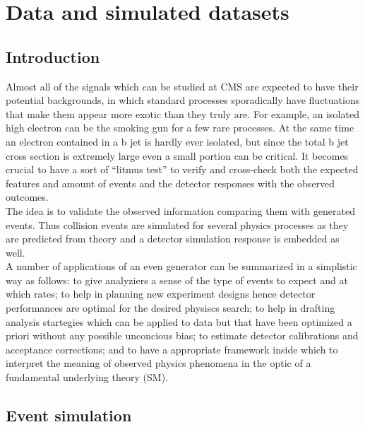 \chapter{Data and simulated datasets} \label{Chapter4} 


\section{Introduction}

Almost all of the signals which can be studied at CMS are
expected to have their potential backgrounds, in which standard
processes sporadically have fluctuations that make them appear more exotic than they truly are.
For example, an isolated high \pt electron can be the smoking gun for
a few rare processes. At the same time an electron contained in a b
jet is hardly ever isolated, but since the total b jet cross section
is extremely large even a small portion can be critical. It becomes
crucial to have a sort of ``litmus test'' to verify and cross-check
both the expected features and amount of events and the detector
responses with the observed outcomes.\\
The idea is to validate the observed information comparing them with
generated events. Thus collision events are simulated for
several physics processes as they are predicted from theory and a
detector simulation response is embedded as well. \\
A number of applications of an even generator can be summarized in a
simplistic way as follows: to give analyziers a sense of the type of
events to expect and at which rates; to help in planning new
experiment designs hence detector performances are optimal for the
desired physiscs search; to help in drafting analysis startegies which
can be applied to data but that have been optimized a priori without
any possible unconcious bias; to estimate detector calibrations and acceptance
corrections; and to have a appropriate framework inside which to
interpret the meaning of observed physics phenomena in the optic of a
fundamental underlying theory (SM).



\section{Event simulation}\label{sec:c4eventsimulation}
~\cite{mc}


~\cite{Alwall_2014}
~\cite{Alioli_2010}
~\cite{Ball_2015}
~\cite{Sj_strand_2008}
~\cite{Sj_strand_2015}
~\cite{Khachatryan_2016}
~\cite{Sirunyan_2020_pythia}




